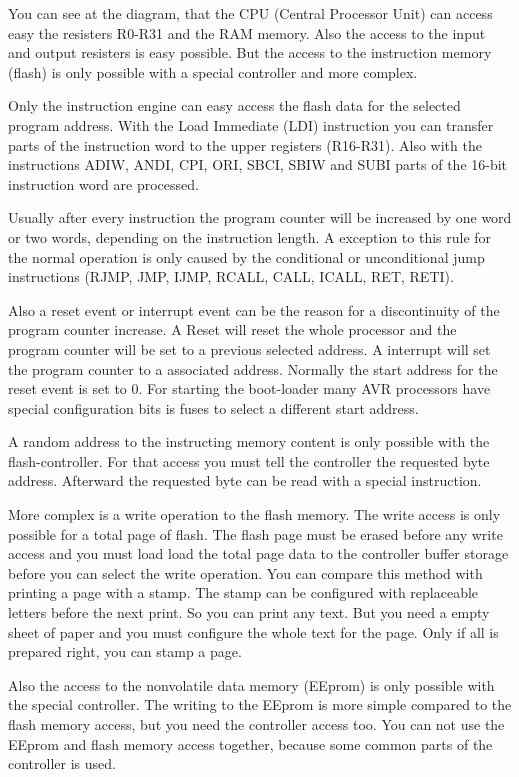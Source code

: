 You can see at the diagram, that the CPU (Central Processor Unit) can
access easy the resisters R0-R31 and the RAM memory.
Also the access to the input and output resisters is easy possible.
But the access to the instruction memory (flash) is only possible
with a special controller and more complex.

Only the instruction engine can easy access the flash data for
the selected program address.
With the Load Immediate (LDI) instruction you can transfer parts of 
the instruction word to the upper registers (R16-R31).
Also with the instructions ADIW, ANDI, CPI, ORI, SBCI, SBIW and SUBI 
parts of the 16-bit instruction word are processed.

Usually after every instruction the program counter will be
increased by one word or two words, depending on the instruction length.
A exception to this rule for the normal operation is only
caused by the conditional or unconditional jump instructions
(RJMP, JMP, IJMP, RCALL, CALL, ICALL, RET, RETI).

Also a reset event or interrupt event can be the reason for
a discontinuity of the program counter increase.
A Reset will reset the whole processor and the program counter
will be set to a previous selected address.
A interrupt will set the program counter to a associated address.
Normally the start address for the reset event is set to 0.
For starting the boot-loader many AVR processors have special
configuration bits is fuses to select a different start address.

A random address to the instructing memory content is only possible
with the flash-controller.
For that access you must tell the controller the requested  byte address.
Afterward the requested byte can be read with a special instruction.

More complex is a write operation to the flash memory.
The write access is only possible for a total page of flash.
The flash page must be erased before any write access and
you must load load the total page data to the controller buffer storage
before you can select the write operation.
You can compare this method with printing a page with a stamp.
The stamp can be configured with replaceable letters before the next print.
So you can print any text.
But you need a empty sheet of paper and you must configure the whole
text for the page.
Only if all is prepared right, you can stamp a page.

Also the access to the nonvolatile data memory (EEprom) is only possible
with the special controller. The writing to the EEprom is more
simple compared to the flash memory access, but you need the
controller access too.
You can not use the EEprom and flash memory access together,
because some common parts of the controller is used.


